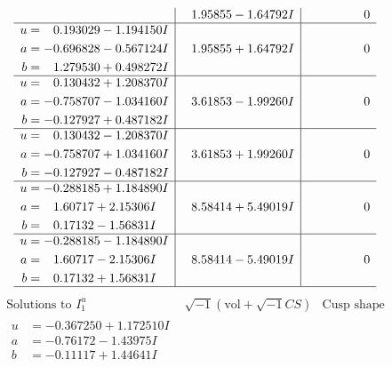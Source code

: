 \documentclass[1p]{elsarticle_modified}
\theoremstyle{definition}
\newcommand{\I}{\sqrt{-1}}
\begin{document}
$$\begin{array}{c|c|c}
 & \phantom{-}1.95855 - 1.64792 I & \phantom{-0.000000 } 0 \\ \hline\begin{aligned}
u &= \phantom{-}0.193029 - 1.194150 I \\
a &= -0.696828 - 0.567124 I \\
b &= \phantom{-}1.279530 + 0.498272 I\end{aligned}
 & \phantom{-}1.95855 + 1.64792 I & \phantom{-0.000000 } 0 \\ \hline\begin{aligned}
u &= \phantom{-}0.130432 + 1.208370 I \\
a &= -0.758707 - 1.034160 I \\
b &= -0.127927 + 0.487182 I\end{aligned}
 & \phantom{-}3.61853 - 1.99260 I & \phantom{-0.000000 } 0 \\ \hline\begin{aligned}
u &= \phantom{-}0.130432 - 1.208370 I \\
a &= -0.758707 + 1.034160 I \\
b &= -0.127927 - 0.487182 I\end{aligned}
 & \phantom{-}3.61853 + 1.99260 I & \phantom{-0.000000 } 0 \\ \hline\begin{aligned}
u &= -0.288185 + 1.184890 I \\
a &= \phantom{-}1.60717 + 2.15306 I \\
b &= \phantom{-}0.17132 - 1.56831 I\end{aligned}
 & \phantom{-}8.58414 + 5.49019 I & \phantom{-0.000000 } 0 \\ \hline\begin{aligned}
u &= -0.288185 - 1.184890 I \\
a &= \phantom{-}1.60717 - 2.15306 I \\
b &= \phantom{-}0.17132 + 1.56831 I\end{aligned}
 & \phantom{-}8.58414 - 5.49019 I & \phantom{-0.000000 } 0\\
 \hline 
 \end{array}$$\newpage$$\begin{array}{c|c|c}  
\text{Solutions to }I^u_{1}& \I (\text{vol} + \sqrt{-1}CS) & \text{Cusp shape}\\
 \hline 
\begin{aligned}
u &= -0.367250 + 1.172510 I \\
a &= -0.76172 - 1.43975 I \\
b &= -0.11117 + 1.44641 I\end{aligned}

\end{array}$$
\end{document}

